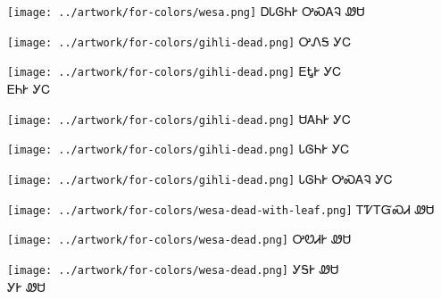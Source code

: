 \documentclass[avery5371]{flashcards}%
\begin{document}
\begin{flashcard}{
\texttt{[image: ../artwork/for-colors/wesa.png]}
}\Huge ᎠᏓᎶᏂᎨ ᎤᏍᎪᎸ ᏪᏌ
\end{flashcard}

\begin{flashcard}{
\texttt{[image: ../artwork/for-colors/gihli-dead.png]}
}\Huge ᎤᏁᎦ ᎩᏟ
\end{flashcard}

\begin{flashcard}{
\texttt{[image: ../artwork/for-colors/gihli-dead.png]}
}\Huge ᎬᎿᎨ ᎩᏟ\\ᎬᏂᎨ ᎩᏟ
\end{flashcard}

\begin{flashcard}{
\texttt{[image: ../artwork/for-colors/gihli-dead.png]}
}\Huge ᏌᎪᏂᎨ ᎩᏟ
\end{flashcard}

\begin{flashcard}{
\texttt{[image: ../artwork/for-colors/gihli-dead.png]}
}\Huge ᏓᎶᏂᎨ ᎩᏟ
\end{flashcard}

\begin{flashcard}{
\texttt{[image: ../artwork/for-colors/gihli-dead.png]}
}\Huge ᏓᎶᏂᎨ ᎤᏍᎪᎸ ᎩᏟ
\end{flashcard}

\begin{flashcard}{
\texttt{[image: ../artwork/for-colors/wesa-dead-with-leaf.png]}
}\Huge ᎢᏤᎢᏳᏍᏗ ᏪᏌ
\end{flashcard}

\begin{flashcard}{
\texttt{[image: ../artwork/for-colors/wesa-dead.png]}
}\Huge ᎤᏬᏗᎨ ᏪᏌ
\end{flashcard}

\begin{flashcard}{
\texttt{[image: ../artwork/for-colors/wesa-dead.png]}
}\Huge ᎩᎦᎨ ᏪᏌ\\ᎩᎨ ᏪᏌ
\end{flashcard}
\end{document}
